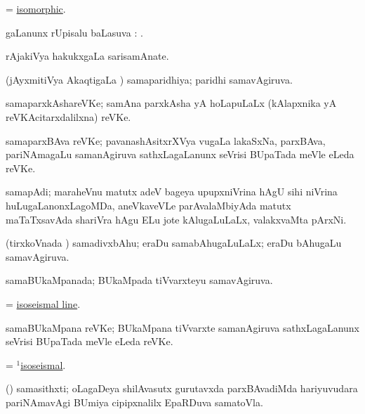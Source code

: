 \bentry
{}
\gl{\gu}
\bmng
=  \hyperlink{isomorphic}{isomorphic}. 
\emng
\eentry

\bentry
{}
\gl{\uparx}
\bmng
\nA gaLanunx rUpisalu baLasuva \uparx: . 
\emng
\eentry

\bentry
{}
\gl{\nA}
\bmng
rAjakiVya hakukxgaLa sarisamAnate. 
\emng
\eentry

\bentry
{}
\gl{\gu}
\bmng
(jAyxmitiVya AkaqtigaLa \vi) samaparidhiya; paridhi samavAgiruva. 
\emng
\eentry

\bentry
{}
\gl{\nA}
\bmng
samaparxkAshareVKe; samAna parxkAsha yA hoLapuLaLx (kAlapxnika yA reVKAcitarxdalilxna) reVKe. 
\emng
\eentry

\bentry
{}
\gl{\nA}
\bmng
samaparxBAva reVKe; pavanashAsitxrXVya \mo vugaLa lakaSxNa, parxBAva, pariNAmagaLu samanAgiruva sathxLagaLanunx seVrisi BUpaTada meVle eLeda reVKe. 
\emng
\eentry

\bentry
{}
\gl{\nA}
\bmng
samapAdi; maraheVnu matutx adeV bageya upupxniVrina hAgU sihi niVrina huLugaLanonxLagoMDa, aneVkaveVLe parAvalaMbiyAda matutx maTaTxsavAda shariVra hAgu ELu jote kAlugaLuLaLx, valakxvaMta pArxNi. 
\emng
\eentry

\bentry
{}
\gl{\gu}
\bmng
(tirxkoVnada \vi) samadivxbAhu; eraDu samabAhugaLuLaLx; eraDu bAhugaLu samavAgiruva. 
\emng
\eentry

\bentry
{}
\gl{\gu}
\bmng
samaBUkaMpanada; BUkaMpada tiVvarxteyu samavAgiruva. 
\emng
\eentry

\bentry
{}
\gl{\nA}
\bmng
= \hyperlink{isoseismal line}{isoseismal line}. 
\emng
\eentry

\bentry
{}
\gl{\nA}
\bmng
samaBUkaMpana reVKe; BUkaMpana tiVvarxte samanAgiruva sathxLagaLanunx seVrisi BUpaTada meVle eLeda reVKe. 
\emng
\eentry

\bentry
{}
\gl{\gu}
\bmng
= \hyperlink{isoseismal(1)}{$^1$isoseismal}. 
\emng
\eentry

\bentry
{}
\gl{\nA}
\bmng
(\BUvi) samasithxti; oLagaDeya shilAvasutx gurutavxda parxBAvadiMda hariyuvudara pariNAmavAgi BUmiya cipipxnalilx EpaRDuva samatoVla. 
\emng
\eentry

